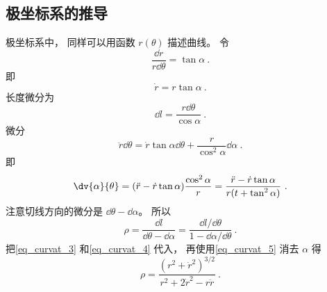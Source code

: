 \subsection{极坐标系的推导}
极坐标系中， 同样可以用函数 $r(\theta)$ 描述曲线。
令
\begin{equation}
\frac{\dd{r}}{r \dd{\theta}} = \tan\alpha~.
\end{equation}
即
\begin{equation}\label{eq_curvat_5}
\dot r = r\tan\alpha~.
\end{equation}
长度微分为
\begin{equation}
\dd{l} = \frac{r\dd{\theta}}{\cos\alpha}~.
\end{equation}
微分
\begin{equation}
\ddot r\dd{\theta} = \dot r\tan\alpha\dd{\theta} + \frac{r}{\cos^2\alpha}\dd{\alpha}~.
\end{equation}
即
\begin{equation}\label{eq_curvat_4}
\dv{\alpha}{\theta} = (\ddot r - \dot r \tan\alpha) \frac{\cos^2\alpha}{r} = \frac{\ddot r - \dot r\tan\alpha}{r(t + \tan^2\alpha)}~.
\end{equation}
注意切线方向的微分是 $\dd{\theta} - \dd{\alpha}$。 所以
\begin{equation}
\rho = \frac{\dd{l}}{\dd{\theta} - \dd{\alpha}} = \frac{\dd{l}/\dd{\theta}}{1 - \dd{\alpha}/\dd{\theta}}~.
\end{equation}
把\autoref{eq_curvat_3} 和\autoref{eq_curvat_4} 代入， 再使用\autoref{eq_curvat_5} 消去 $\alpha$ 得
\begin{equation}
\rho = \frac{(r^2 + \dot r^2)^{3/2}}{r^2 + 2\dot r^2 - r\ddot r}~.
\end{equation}
